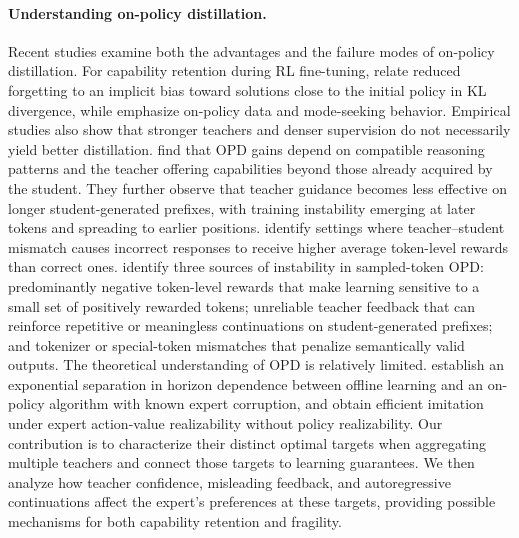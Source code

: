 \documentclass[11pt]{article}
\begin{document}
\paragraph{Understanding on-policy distillation.}
Recent studies examine both the advantages and the failure modes of on-policy distillation. For capability retention during RL fine-tuning, \citet{shenfeld2026rl} relate reduced forgetting to an implicit bias toward solutions close to the initial policy in KL divergence, while \citet{chen2025retaining} emphasize on-policy data and mode-seeking behavior. Empirical studies also show that stronger teachers and denser supervision do not necessarily yield better distillation. \citet{li2026rethinking} find that OPD gains depend on compatible reasoning patterns and the teacher offering capabilities beyond those already acquired by the student. They further observe that teacher guidance becomes less effective on longer student-generated prefixes, with training instability emerging at later tokens and spreading to earlier positions. \citet{wang2026demystifying} identify settings where teacher--student mismatch causes incorrect responses to receive higher average token-level rewards than correct ones. \citet{fu2026revisiting} identify three sources of instability in sampled-token OPD: predominantly negative token-level rewards that make learning sensitive to a small set of positively rewarded tokens; unreliable teacher feedback that can reinforce repetitive or meaningless continuations on student-generated prefixes; and tokenizer or special-token mismatches that penalize semantically valid outputs. The theoretical understanding of OPD is relatively limited. \citet{sriraman2026behavior} establish an exponential separation in horizon dependence between offline learning and an on-policy algorithm with known expert corruption, and \citet{viano2026interaction} obtain efficient imitation under expert action-value realizability without policy realizability. Our contribution is to characterize their distinct optimal targets when aggregating multiple teachers and connect those targets to learning guarantees. We then analyze how teacher confidence, misleading feedback, and autoregressive continuations affect the expert's preferences at these targets, providing possible mechanisms for both capability retention and fragility. 
\end{document}
